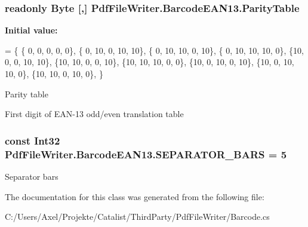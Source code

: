\subsubsection[{\texorpdfstring{Parity\+Table}{ParityTable}}]{\setlength{\rightskip}{0pt plus 5cm}readonly Byte \mbox{[},\mbox{]} Pdf\+File\+Writer.\+Barcode\+E\+A\+N13.\+Parity\+Table\hspace{0.3cm}{\ttfamily [static]}}\hypertarget{class_pdf_file_writer_1_1_barcode_e_a_n13_ad88f52a0be979f25071f4ffa0165142e}{}\label{class_pdf_file_writer_1_1_barcode_e_a_n13_ad88f52a0be979f25071f4ffa0165142e}
{\bfseries Initial value\+:}
\begin{DoxyCode}
=
        \{
        \{ 0,  0,  0,  0,  0\},   
        \{ 0, 10,  0, 10, 10\},   
        \{ 0, 10, 10,  0, 10\},   
        \{ 0, 10, 10, 10,  0\},   
        \{10,  0,  0, 10, 10\},   
        \{10, 10,  0,  0, 10\},   
        \{10, 10, 10,  0,  0\},   
        \{10,  0, 10,  0, 10\},   
        \{10,  0, 10, 10,  0\},   
        \{10, 10,  0, 10,  0\},   
        \}
\end{DoxyCode}


Parity table 

First digit of E\+A\+N-\/13 odd/even translation table
\subsubsection[{\texorpdfstring{S\+E\+P\+A\+R\+A\+T\+O\+R\+\_\+\+B\+A\+RS}{SEPARATOR_BARS}}]{\setlength{\rightskip}{0pt plus 5cm}const Int32 Pdf\+File\+Writer.\+Barcode\+E\+A\+N13.\+S\+E\+P\+A\+R\+A\+T\+O\+R\+\_\+\+B\+A\+RS = 5}\hypertarget{class_pdf_file_writer_1_1_barcode_e_a_n13_a85621ae6d8223c9cc2d6fd26c32a1c27}{}\label{class_pdf_file_writer_1_1_barcode_e_a_n13_a85621ae6d8223c9cc2d6fd26c32a1c27}


Separator bars 



The documentation for this class was generated from the following file\+:\begin{DoxyCompactItemize}
\item 
C\+:/\+Users/\+Axel/\+Projekte/\+Catalist/\+Third\+Party/\+Pdf\+File\+Writer/Barcode.\+cs\end{DoxyCompactItemize}

